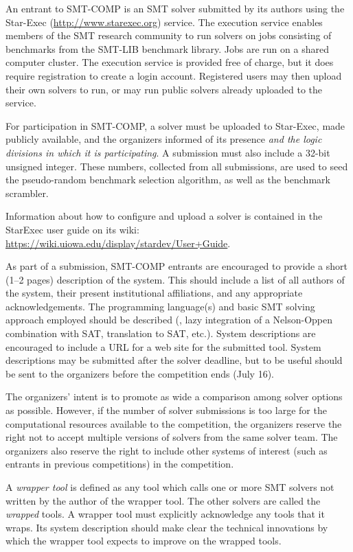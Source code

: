 \documentclass[12pt]{article}
\begin{document}
An entrant to SMT-COMP is an SMT solver
submitted by its authors using the Star-Exec (\url{http://www.starexec.org}) service.  
The execution service enables members of the
SMT research community to run solvers on jobs consisting of benchmarks
from the SMT-LIB benchmark library.  Jobs are run on a shared computer
cluster.  The execution service is provided free of
charge, but it does require registration to create a login account.  Registered users
may then upload their own solvers to run, or may run public solvers
already uploaded to the service.  


For participation in SMT-COMP, a solver must be
uploaded to Star-Exec, made publicly available, and the organizers informed of its presence {\em and the logic divisions in which it is participating}.
A submission must also include a 32-bit unsigned
integer.  These numbers, collected from all submissions, are used
to seed the pseudo-random benchmark selection algorithm, as well
as the benchmark scrambler.

Information about how to configure and upload a solver is contained in the StarExec user guide on its wiki:
\url{https://wiki.uiowa.edu/display/stardev/User+Guide}.

As part of a submission,
SMT-COMP entrants are encouraged to provide a short (1--2 pages) description of
the system.  This should include a list of all authors of the system,
 their present institutional affiliations, and any appropriate acknowledgements.  The programming
language(s) and basic SMT solving approach employed should be
described (\eg, lazy integration of a Nelson-Oppen combination with
SAT, translation to SAT, etc.).  System descriptions are encouraged to
include a URL for a web site for the submitted tool.  System descriptions may be submitted after the solver deadline, but to be useful should be sent to the organizers before the competition ends (July 16).

The organizers' intent is to promote as wide a comparison among solver options as possible.
However, if the number of solver submissions is too large for the
computational resources available to the competition, the organizers reserve the right not to
accept multiple versions of solvers from the same solver team.  The organizers also reserve the right to
include other systems of interest (such as entrants in previous competitions) in the
competition.

A \emph{wrapper tool} is defined as any tool
which calls one or more SMT solvers not written by the author of the wrapper
tool.  The other solvers are called the \emph{wrapped} tools.  
A wrapper tool must explicitly acknowledge any tools that it wraps.
Its system description should make clear the technical innovations by which the
wrapper tool expects to improve on the wrapped tools.
\end{document}
